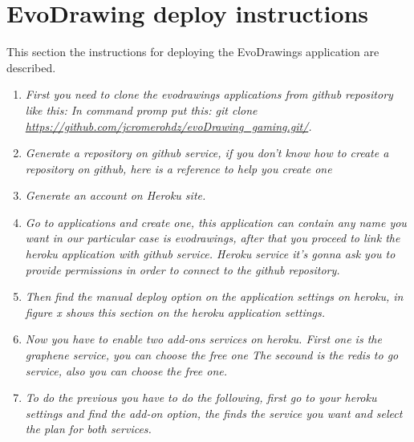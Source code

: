 \chapter{EvoDrawing deploy instructions}\label{apendixa}

This section the instructions for deploying the EvoDrawings application are described.

\begin{enumerate}


\item \textit{First you need to clone the evodrawings
applications from github repository like this: In command promp put this:
git clone \url{https://github.com/jcromerohdz/evoDrawing_gaming.git/}. }


\item \textit{
Generate a repository on github service, if you don’t know how to create a
repository on github, here is a reference to help you create one \cite{}}

\item\textit{Generate an account on Heroku site.}

\item \textit{Go to applications and create one, this application can contain
any name you want in our particular case is evodrawings, after that you proceed
to link the heroku application with github service. Heroku service it’s gonna
ask you to provide permissions in order to connect to the github repository.}

\item \textit{Then find the manual deploy option on the application settings on
heroku, in figure x shows this section on the heroku application settings.}

\item \textit{Now you have to enable two add-ons services on heroku.
First one is the graphene service, you can choose the free one
The secound is the redis to go service, also you can choose the free one.}

\item \textit{To do the previous you have to do the following, first go to your heroku
settings and find the add-on option, the finds the service you want and select
the plan for both services.}





\end{enumerate}
